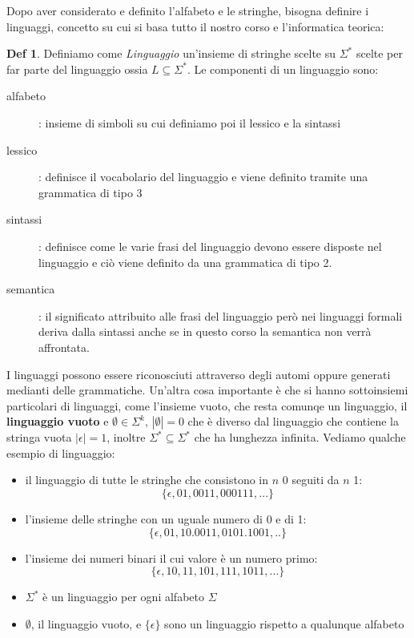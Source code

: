 \documentclass[a4paper]{book}
\theoremstyle{definition}%
\newtheorem*{defi}{Def}%
\begin{document}
Dopo aver considerato e definito l'alfabeto e le stringhe, bisogna definire i linguaggi, concetto su cui si basa tutto il nostro
corso e l'informatica teorica:
\begin{defi}
    Definiamo come \emph{Linguaggio} un'insieme di stringhe scelte su $\Sigma ^ *$ scelte per far parte del linguaggio
    ossia $L \subseteq \Sigma ^ *$.
    Le componenti di un linguaggio sono:
    \begin{description}
    \item [alfabeto] : insieme di simboli su cui definiamo poi il lessico e la sintassi
    \item [lessico]: definisce il vocabolario del linguaggio e viene definito tramite una grammatica di tipo 3
    \item [sintassi]: definisce come le varie frasi del linguaggio devono essere disposte nel linguaggio e ciò
      viene definito da una grammatica di tipo 2.
    \item [semantica]: il significato attribuito alle frasi del linguaggio però nei linguaggi formali deriva dalla sintassi
      anche se in questo corso la semantica non verrà affrontata.
    \end{description}
\end{defi}
I linguaggi possono essere riconosciuti attraverso degli automi oppure generati medianti delle grammatiche.\newline
Un'altra cosa importante è che si hanno sottoinsiemi particolari di linguaggi, come l'insieme vuoto, che resta comunqe un linguaggio,
il \textbf{linguaggio vuoto} e $\emptyset \in \Sigma^k,\,|\emptyset|=0$ che è diverso dal linguaggio che contiene la stringa vuota $|\epsilon|=1$,
inoltre $\Sigma^*\subseteq \Sigma^*$ che ha lunghezza infinita.\newline
Vediamo qualche esempio di linguaggio:
\begin{itemize}
\item il linguaggio di tutte le stringhe che consistono in $n$ 0 seguiti da $n$ 1:
  \[ \{\epsilon,01,0011,000111,...\} \]
\item l'insieme delle stringhe con un uguale numero di 0 e di 1:
  \[ \{\epsilon,01,10.0011,0101.1001,..\} \]
\item l'insieme dei numeri binari il cui valore è un numero primo:
  \[ \{\epsilon,10 , 11, 101, 111,1011,...\} \]
\item $\Sigma^*$ è un linguaggio per ogni alfabeto $\Sigma$
\item $\emptyset$, il linguaggio vuoto, e $\{\epsilon\}$ sono un linguaggio rispetto a qualunque alfabeto
\end{itemize}
\end{document}
